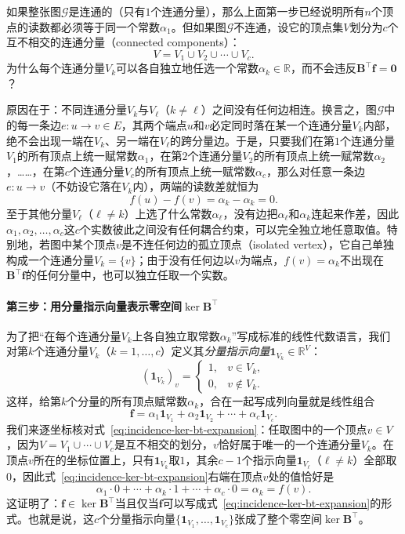 如果整张图$\mathcal{G}$是连通的（只有$1$个连通分量），那么上面第一步已经说明所有$n$个顶点的读数都必须等于同一个常数$\alpha_1$。但如果图$\mathcal{G}$不连通，设它的顶点集$V$划分为$c$个互不相交的连通分量（connected components）：
\[
V=V_1\cup V_2\cup\cdots\cup V_c.
\]
为什么每个连通分量$V_k$可以各自独立地任选一个常数$\alpha_k\in\mathbb{R}$，而不会违反$\bm{B}^\top\bm{f}=\bm{0}$？

原因在于：不同连通分量$V_k$与$V_\ell$（$k\neq\ell$）之间没有任何边相连。换言之，图$\mathcal{G}$中的每一条边$e\colon u\to v\in E$，其两个端点$u$和$v$必定同时落在某一个连通分量$V_k$内部，绝不会出现一端在$V_k$、另一端在$V_\ell$的跨分量边。于是，只要我们在第$1$个连通分量$V_1$的所有顶点上统一赋常数$\alpha_1$，在第$2$个连通分量$V_2$的所有顶点上统一赋常数$\alpha_2$，……，在第$c$个连通分量$V_c$的所有顶点上统一赋常数$\alpha_c$，那么对任意一条边$e\colon u\to v$（不妨设它落在$V_k$内），两端的读数差就恒为
\[
f(u)-f(v)=\alpha_k-\alpha_k=0.
\]
至于其他分量$V_\ell$（$\ell\neq k$）上选了什么常数$\alpha_\ell$，没有边把$\alpha_\ell$和$\alpha_k$连起来作差，因此$\alpha_1,\alpha_2,\ldots,\alpha_c$这$c$个实数彼此之间没有任何耦合约束，可以完全独立地任意取值。特别地，若图中某个顶点$v$是不连任何边的孤立顶点（isolated vertex），它自己单独构成一个连通分量$V_k=\{v\}$；由于没有任何边以$v$为端点，$f(v)=\alpha_k$不出现在$\bm{B}^\top\bm{f}$的任何分量中，也可以独立任取一个实数。

\paragraph{第三步：用分量指示向量表示零空间$\ker\bm{B}^\top$}

为了把“在每个连通分量$V_k$上各自独立取常数$\alpha_k$”写成标准的线性代数语言，我们对第$k$个连通分量$V_k$（$k=1,\ldots,c$）定义其\emph{分量指示向量}$\bm{1}_{V_k}\in\mathbb{R}^V$：
\[
(\bm{1}_{V_k})_v=
\begin{cases}
1,& v\in V_k,\\
0,& v\notin V_k.
\end{cases}
\]
这样，给第$k$个分量的所有顶点赋常数$\alpha_k$，合在一起写成列向量就是线性组合
\begin{equation}
\bm{f}=\alpha_1\bm{1}_{V_1}+\alpha_2\bm{1}_{V_2}+\cdots+\alpha_c\bm{1}_{V_c}.
\label{eq:incidence-ker-bt-expansion}
\end{equation}
我们来逐坐标核对式~\eqref{eq:incidence-ker-bt-expansion}：任取图中的一个顶点$v\in V$，因为$V=V_1\cup\cdots\cup V_c$是互不相交的划分，$v$恰好属于唯一的一个连通分量$V_k$。在顶点$v$所在的坐标位置上，只有$\bm{1}_{V_k}$取$1$，其余$c-1$个指示向量$\bm{1}_{V_\ell}$（$\ell\neq k$）全部取$0$，因此式~\eqref{eq:incidence-ker-bt-expansion}右端在顶点$v$处的值恰好是
\[
\alpha_1\cdot 0+\cdots+\alpha_k\cdot 1+\cdots+\alpha_c\cdot 0=\alpha_k=f(v).
\]
这证明了：$\bm{f}\in\ker\bm{B}^\top$当且仅当$\bm{f}$可以写成式~\eqref{eq:incidence-ker-bt-expansion}的形式。也就是说，这$c$个分量指示向量$\{\bm{1}_{V_1},\ldots,\bm{1}_{V_c}\}$张成了整个零空间$\ker\bm{B}^\top$。

